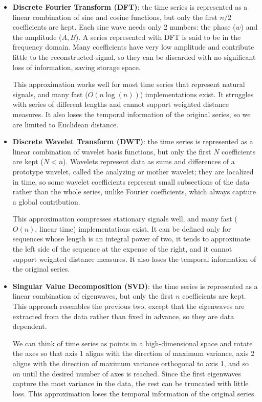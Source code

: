 \begin{itemize}
    \item \textbf{Discrete Fourier Transform (DFT)}: the time series is represented as a linear combination of sine and cosine functions, but only the first $n/2$ coefficients are kept. Each sine wave needs only 2 numbers: the phase ($w$) and the amplitude ($A,B$). A series represented with DFT is said to be in the frequency domain. Many coefficients have very low amplitude and contribute little to the reconstructed signal, so they can be discarded with no significant loss of information, saving storage space.

    This approximation works well for most time series that represent natural signals, and many fast ($O(n \log(n))$) implementations exist. It struggles with series of different lengths and cannot support weighted distance measures. It also loses the temporal information of the original series, so we are limited to Euclidean distance.

    \item \textbf{Discrete Wavelet Transform (DWT)}: the time series is represented as a linear combination of wavelet basis functions, but only the first $N$ coefficients are kept ($N < n$). Wavelets represent data as sums and differences of a prototype wavelet, called the analyzing or mother wavelet; they are localized in time, so some wavelet coefficients represent small subsections of the data rather than the whole series, unlike Fourier coefficients, which always capture a global contribution.

    This approximation compresses stationary signals well, and many fast ($O(n)$, linear time) implementations exist. It can be defined only for sequences whose length is an integral power of two, it tends to approximate the left side of the sequence at the expense of the right, and it cannot support weighted distance measures. It also loses the temporal information of the original series.

    \item \textbf{Singular Value Decomposition (SVD)}: the time series is represented as a linear combination of eigenwaves, but only the first $n$ coefficients are kept. This approach resembles the previous two, except that the eigenwaves are extracted from the data rather than fixed in advance, so they are data dependent.

    We can think of time series as points in a high-dimensional space and rotate the axes so that axis 1 aligns with the direction of maximum variance, axis 2 aligns with the direction of maximum variance orthogonal to axis 1, and so on until the desired number of axes is reached. Since the first eigenwaves capture the most variance in the data, the rest can be truncated with little loss. This approximation loses the temporal information of the original series.


\end{itemize}
